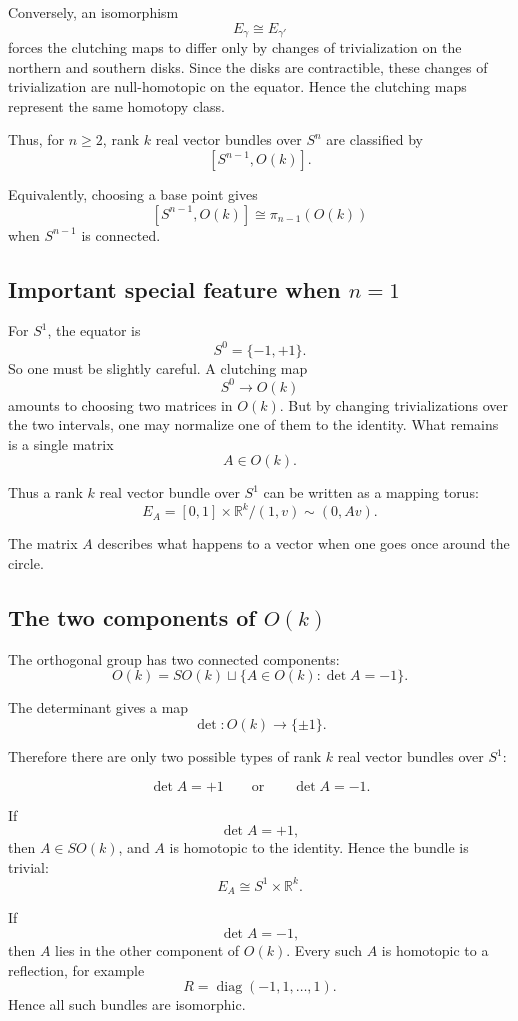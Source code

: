 \documentclass[12pt,a4paper]{article}
\theoremstyle{notespace}
\begin{document}
Conversely, an isomorphism
\[
E_\gamma\cong E_{\gamma'}
\]
forces the clutching maps to differ only by changes of trivialization on the northern and southern disks. Since the disks are contractible, these changes of trivialization are null-homotopic on the equator. Hence the clutching maps represent the same homotopy class.

Thus, for \(n\geq 2\), rank \(k\) real vector bundles over \(S^n\) are classified by
\[
[S^{n-1},O(k)].
\]

Equivalently, choosing a base point gives
\[
[S^{n-1},O(k)]
\cong
\pi_{n-1}(O(k))
\]
when \(S^{n-1}\) is connected.

\subsection{Important special feature when \(n=1\)}

For \(S^1\), the equator is
\[
S^0=\{-1,+1\}.
\]
So one must be slightly careful. A clutching map
\[
S^0\to O(k)
\]
amounts to choosing two matrices in \(O(k)\). But by changing trivializations over the two intervals, one may normalize one of them to the identity. What remains is a single matrix
\[
A\in O(k).
\]

Thus a rank \(k\) real vector bundle over \(S^1\) can be written as a mapping torus:
\[
E_A=
[0,1]\times \mathbb{R}^k
\big/
(1,v)\sim (0,Av).
\]

The matrix \(A\) describes what happens to a vector when one goes once around the circle.

\subsection{The two components of \(O(k)\)}

The orthogonal group has two connected components:
\[
O(k)=SO(k)\sqcup \{A\in O(k):\det A=-1\}.
\]

The determinant gives a map
\[
\det:O(k)\to \{\pm 1\}.
\]

Therefore there are only two possible types of rank \(k\) real vector bundles over \(S^1\):

\[
\det A=+1
\qquad\text{or}\qquad
\det A=-1.
\]

If
\[
\det A=+1,
\]
then \(A\in SO(k)\), and \(A\) is homotopic to the identity. Hence the bundle is trivial:
\[
E_A\cong S^1\times \mathbb{R}^k.
\]

If
\[
\det A=-1,
\]
then \(A\) lies in the other component of \(O(k)\). Every such \(A\) is homotopic to a reflection, for example
\[
R=
\operatorname{diag}(-1,1,\dots,1).
\]
Hence all such bundles are isomorphic.
\end{document}
